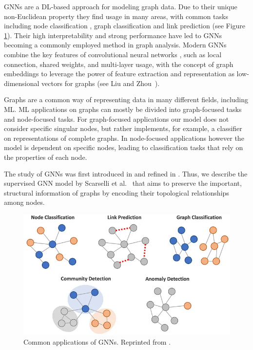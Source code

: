 \acp{GNN} \cite{4700287} are a DL-based approach for modeling graph data. Due to their unique non-Euclidean property they find usage in many areas, with common tasks including node classification \cite{gao2019graph}, graph classification \cite{xu2018powerful} and link prediction \cite{zhang2018link} (see Figure \ref{fig:gnn_tasks}). Their high interpretability and strong performance have led to GNNs becoming a commonly employed method in graph analysis. Modern GNNs combine the key features of convolutional neural networks \cite{726791}, such as local connection, shared weights, and multi-layer usage, with the concept of graph embeddings \cite{cai2018comprehensive} to leverage the power of feature extraction and representation as low-dimensional vectors for graphs (see Liu and Zhou~\cite{Liu2020}).\bigskip

Graphs are a common way of representing data in many different fields, including ML. ML applications on graphs can mostly be divided into graph-focused tasks and node-focused tasks. For graph-focused applications our model does not consider specific singular nodes, but rather implements, for example, a classifier on representations of complete graphs. In node-focused applications however the model is dependent on specific nodes, leading to classification tasks that rely on the properties of each node.

The study of GNNs was first introduced in \cite{gori2005new} and refined in \cite{4700287}. Thus, we describe the supervised GNN model by Scarselli et al.~\cite{4700287} that aims to preserve the important, structural information of graphs by encoding their topological relationships among nodes. \bigskip

\begin{figure}
    \includegraphics[width=\textwidth]{img/graph_tasks.png}
    \caption[Applications of GNNs]{Common applications of GNNs. Reprinted from \cite{masui2022gnn}.}
    \label{fig:gnn_tasks}
\end{figure}

